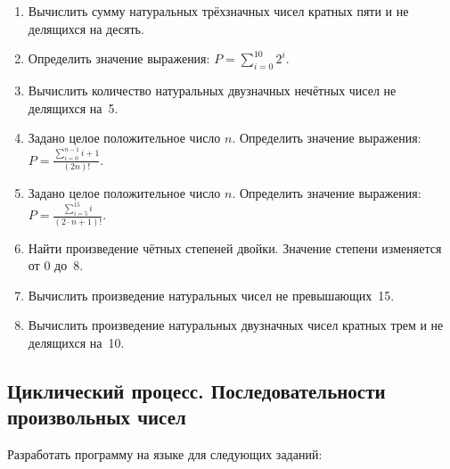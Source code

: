 \begin{enumerate}
\item Вычислить сумму натуральных трёхзначных чисел кратных пяти и не делящихся на десять.
\item Определить значение выражения:
 $P=\sum\limits_{i=0}^{10}2^{i}.$
\item Вычислить количество натуральных двузначных нечётных чисел не делящихся на~5.
\item Задано целое положительное число $n$. Определить значение выражения:
 $P=\frac{\sum\limits_{i=0}^{n-1}i+1}{(2n)!}.$
\item Задано целое положительное число $n$. Определить значение выражения:
 $P=\frac{\sum\limits_{i=5}^{15}i}{(2\cdot n+1)!}.$
\item Найти произведение чётных степеней двойки. Значение степени изменяется от 0 до~8.
\item Вычислить произведение натуральных чисел не превышающих~15.
\item Вычислить произведение натуральных двузначных чисел кратных трем и не делящихся на~10.
\end{enumerate}

\subsection[Циклический процесс. Последовательности произвольных чисел]{Циклический процесс. Последовательности
произвольных чисел}
Разработать программу на языке  для следующих заданий:

